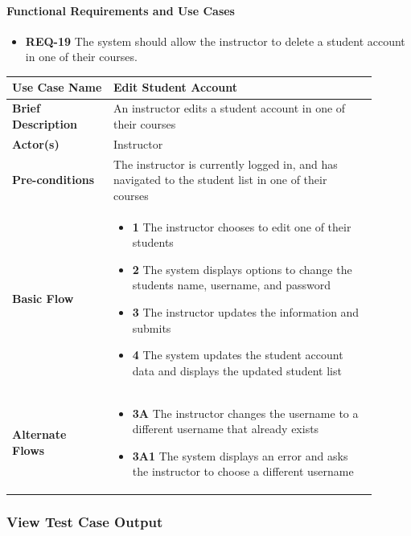 \documentclass{article}
\begin{document}
\paragraph{Functional Requirements and Use Cases}
\begin{itemize}
  \item \textbf{REQ-19} The system should allow the instructor to delete a student account in one of their courses.
\end{itemize}

\begin{tabular}{| p{0.25\linewidth} | p{0.65\linewidth} |}
  \hline
  \textbf{Use Case Name} & Edit Student Account\\
  \hline
  \textbf{Brief Description} & An instructor edits a student account in one of their courses\\
  \hline
  \textbf{Actor(s)} & Instructor \\
  \hline
  \textbf{Pre-conditions} & The instructor is currently logged in, and has navigated to the student list in one of their courses\\
  \hline
  \textbf{Basic Flow} & \begin{itemize}
    \item[] \textbf{1} The instructor chooses to edit one of their students
    \item[] \textbf{2} The system displays options to change the students name, username, and password
    \item[] \textbf{3} The instructor updates the information and submits
    \item[] \textbf{4} The system updates the student account data and displays the updated student list
  \end{itemize}\\
  \hline
  \textbf{Alternate Flows} & \begin{itemize}
    \item[] \textbf{3A} The instructor changes the username to a different username that already exists
    \item[] \textbf{3A1} The system displays an error and asks the instructor to choose a different username
  \end{itemize}\\
  \hline
\end{tabular}

\subsubsection{View Test Case Output}
\end{document}
